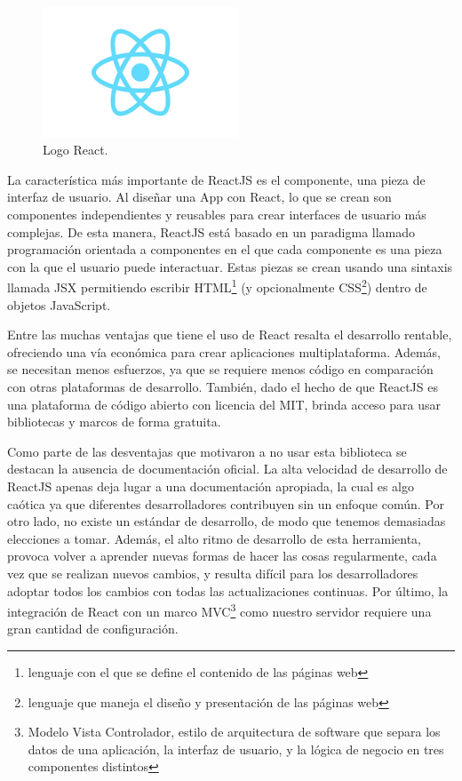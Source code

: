 \begin{figure}
\vspace{-20pt}
\begin{center}
\includegraphics[width=0.52\textwidth]{images/reactLogo.png} 
\end{center} \vspace{-20pt} \caption{Logo React.}  \label{react} \vspace{-10pt} 
\end{figure}

La caracter\'istica m\'as importante de ReactJS es el componente, una pieza de interfaz de usuario. Al dise\~nar una App con React, lo que se crean son componentes independientes y reusables para crear interfaces de usuario m\'as complejas. De esta manera, ReactJS est\'a basado en un paradigma llamado programaci\'on orientada a componentes en el que cada componente es una pieza con la que el usuario puede interactuar. Estas piezas se crean usando una sintaxis llamada JSX \cite{react} permitiendo escribir HTML\footnote{lenguaje con el que se define el contenido de las p\'aginas web} (y opcionalmente CSS\footnote{lenguaje que maneja el dise\~no y presentaci\'on de las p\'aginas web}) dentro de objetos JavaScript.

Entre las muchas ventajas que tiene el uso de React resalta el desarrollo rentable, ofreciendo una v\'ia econ\'omica para crear aplicaciones multiplataforma. Adem\'as, se necesitan menos esfuerzos, ya que se requiere menos c\'odigo en comparaci\'on con otras plataformas de desarrollo. Tambi\'en, dado el hecho de que ReactJS es una plataforma de c\'odigo abierto con licencia del MIT, brinda acceso para usar bibliotecas y marcos de forma gratuita.

Como parte de las desventajas que motivaron a no usar esta biblioteca se destacan la ausencia de documentaci\'on oficial. La alta velocidad de desarrollo de ReactJS apenas deja lugar a una documentaci\'on apropiada, la cual es algo ca\'otica ya que diferentes desarrolladores contribuyen sin un enfoque com\'un. Por otro lado, no existe un est\'andar de desarrollo, de modo que tenemos demasiadas elecciones a tomar. Adem\'as, el alto ritmo de desarrollo de esta herramienta, provoca volver a aprender nuevas formas de hacer las cosas regularmente, cada vez que se realizan nuevos cambios, y resulta dif\'icil para los desarrolladores adoptar todos los cambios con todas las actualizaciones continuas. Por \'ultimo, la integraci\'on de React con un marco MVC\footnote{Modelo Vista Controlador, estilo de arquitectura de software que separa los datos de una aplicaci\'on, la interfaz de usuario, y la l\'ogica de negocio en tres componentes distintos} como nuestro servidor requiere una gran cantidad de configuraci\'on.


